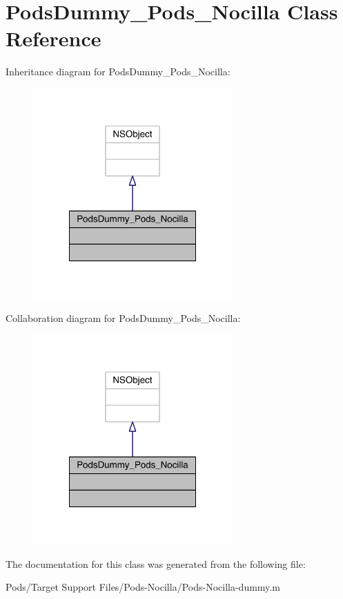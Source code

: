 \hypertarget{interface_pods_dummy___pods___nocilla}{\section{Pods\-Dummy\-\_\-\-Pods\-\_\-\-Nocilla Class Reference}
\label{interface_pods_dummy___pods___nocilla}
}


Inheritance diagram for Pods\-Dummy\-\_\-\-Pods\-\_\-\-Nocilla\-:\nopagebreak
\begin{figure}[H]
\begin{center}
\leavevmode
\includegraphics[width=216pt]{interface_pods_dummy___pods___nocilla__inherit__graph}
\end{center}
\end{figure}


Collaboration diagram for Pods\-Dummy\-\_\-\-Pods\-\_\-\-Nocilla\-:\nopagebreak
\begin{figure}[H]
\begin{center}
\leavevmode
\includegraphics[width=216pt]{interface_pods_dummy___pods___nocilla__coll__graph}
\end{center}
\end{figure}


The documentation for this class was generated from the following file\-:\begin{DoxyCompactItemize}
\item 
Pods/\-Target Support Files/\-Pods-\/\-Nocilla/Pods-\/\-Nocilla-\/dummy.\-m\end{DoxyCompactItemize}
